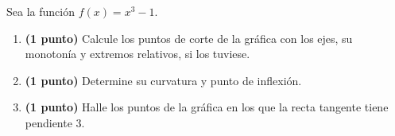 
Sea la función $f(x)=x^3-1$.
\begin{enumerate}[label=\alph*)]
\item \textbf{(1 punto)} Calcule los puntos de corte de la gráfica con los ejes, su monotonía y extremos relativos, si los tuviese.
\item \textbf{(1 punto)} Determine su curvatura y punto de inflexión.
\item \textbf{(1 punto)} Halle los puntos de la gráfica en los que la recta tangente tiene pendiente 3.
\end{enumerate}

